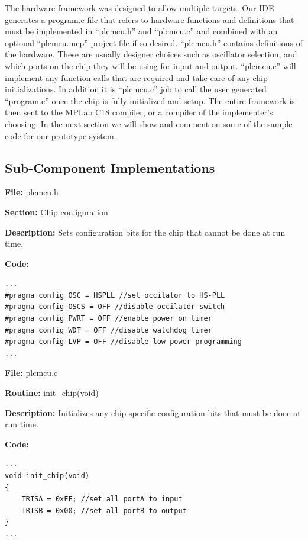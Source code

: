 The hardware framework was designed to allow multiple targets. Our IDE generates a program.c file that refers to hardware functions and definitions that must be implemented in ``plcmcu.h'' and ``plcmcu.c'' and combined with an optional ``plcmcu.mcp'' project file if so desired. ``plcmcu.h'' contains definitions of the hardware. These are usually designer choices such as oscillator selection, and which ports on the chip they will be using for input and output. ``plcmcu.c'' will implement any function calls that are required and take care of any chip initializations. In addition it is ``plcmcu.c'' job to call the user generated ``program.c'' once the chip is fully initialized and setup. The entire framework is then sent to the MPLab C18 compiler, or a compiler of the implementer's choosing. In the next section we will show and comment on some of the sample code for our prototype system.


\subsection{Sub-Component Implementations} 

\textbf{File:} plcmcu.h

\textbf{Section:} Chip configuration 

\textbf{Description:} Sets configuration bits for the chip that cannot be done at run time.

\textbf{Code:}



\begin{lstlisting}[frame=single]
...
#pragma config OSC = HSPLL //set occilator to HS-PLL
#pragma config OSCS = OFF //disable occilator switch
#pragma config PWRT = OFF //enable power on timer
#pragma config WDT = OFF //disable watchdog timer
#pragma config LVP = OFF //disable low power programming
...
\end{lstlisting}



\textbf{File:} plcmcu.c

\textbf{Routine:} init\_chip(void)

\textbf{Description:} Initializes any chip specific configuration bits that must be done at run time.

\textbf{Code:}



\begin{lstlisting}[frame=single]
...
void init_chip(void)
{	
	TRISA = 0xFF; //set all portA to input
	TRISB = 0x00; //set all portB to output
}
...
\end{lstlisting}




